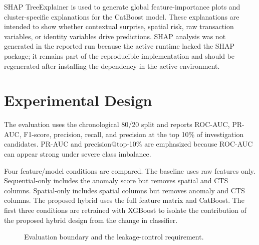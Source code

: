 \documentclass[conference]{IEEEtran}
\begin{document}
SHAP TreeExplainer is used to generate global feature-importance plots and cluster-specific explanations for the CatBoost model. These explanations are intended to show whether contextual surprise, spatial risk, raw transaction variables, or identity variables drive predictions. SHAP analysis was not generated in the reported run because the active runtime lacked the SHAP package; it remains part of the reproducible implementation and should be regenerated after installing the dependency in the active environment.

\section{Experimental Design}
The evaluation uses the chronological 80/20 split and reports ROC-AUC, PR-AUC, F1-score, precision, recall, and precision at the top 10\% of investigation candidates. PR-AUC and precision@top-10\% are emphasized because ROC-AUC can appear strong under severe class imbalance.

Four feature/model conditions are compared. The baseline uses raw features only. Sequential-only includes the anomaly score but removes spatial and CTS columns. Spatial-only includes spatial columns but removes anomaly and CTS columns. The proposed hybrid uses the full feature matrix and CatBoost. The first three conditions are retrained with XGBoost to isolate the contribution of the proposed hybrid design from the change in classifier.

\begin{figure}[t]
\centering
{}
\caption{Evaluation boundary and the leakage-control requirement.}
\label{fig:validity}
\end{figure}
\end{document}
